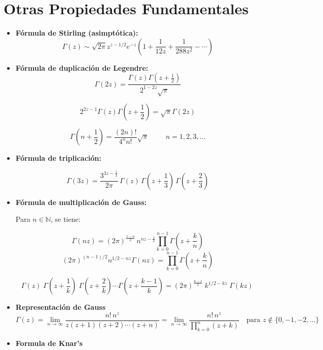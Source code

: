 \section{ Otras Propiedades Fundamentales}

\begin{itemize}

	\item \textbf{Fórmula de Stirling (asimptótica):}
	      \[
		      \Gamma(z) \sim \sqrt{2\pi} z^{z - 1/2} e^{-z} \left( 1 + \frac{1}{12z} + \frac{1}{288z^2} - \cdots \right)
	      \]
	\item \textbf{Fórmula de duplicación de Legendre:}
	      \[
		      \Gamma(2z) = \frac{\Gamma(z)\Gamma\left(z + \tfrac{1}{2} \right)}{2^{1 - 2z} \sqrt{\pi}}
	      \]

	      $$
		      2^{2z-1}\Gamma(z)\Gamma\left( z+\dfrac{1}{2}\right) =\sqrt{\pi}\Gamma(2z)
	      $$

	      $$
		      \Gamma\left( n+\dfrac{1}{2}\right) =\dfrac{(2n)!}{4^n n!}\sqrt{\pi} \hspace{1cm} n=1,2,3,\ldots
	      $$

	\item \textbf{Fórmula de triplicación:}

	      \[
		      \Gamma(3z) = \frac{3^{3z - \frac{1}{2}}}{2\pi} \, \Gamma(z) \, \Gamma\left(z + \frac{1}{3} \right) \, \Gamma\left(z + \frac{2}{3} \right)
	      \]

	\item \textbf{Fórmula de multiplicación de Gauss:}

	      Para \( n \in \mathbb{N} \), se tiene:

	      \[
		      \Gamma(nz) = (2\pi)^{\frac{1-n}{2}} \, n^{nz - \frac{1}{2}} \prod_{k=0}^{n-1} \Gamma\left(z + \frac{k}{n} \right)
	      \]
	      $$
		      (2\pi)^{(n-1)/2}  n^{1/2-nz}\Gamma(nz)=\prod_{k=0}^{n-1}\Gamma\left( z+\dfrac{k}{n}\right)
	      $$

	      $$
		      {\displaystyle \Gamma (z)\;\Gamma \left(z+{\frac {1}{k}}\right)\;\Gamma \left(z+{\frac {2}{k}}\right)\cdots \Gamma \left(z+{\frac {k-1}{k}}\right)=(2\pi )^{\frac {k-1}{2}}\;k^{1/2-kz}\;\Gamma (kz)\,\!}
	      $$
	\item \textbf{Representación de Gauss }
	      \[
		      \Gamma(z) = \lim_{n \to \infty} \frac{n! \, n^z}{z (z+1) (z+2) \cdots (z+n)} = \lim_{n \to \infty} \frac{n! \, n^z}{\prod_{k=0}^{n} (z + k)}
		      \quad \text{para } z \notin \{0, -1, -2, \dots\}
	      \]
	\item \textbf{Formula de Knar's  }


\end{itemize}
